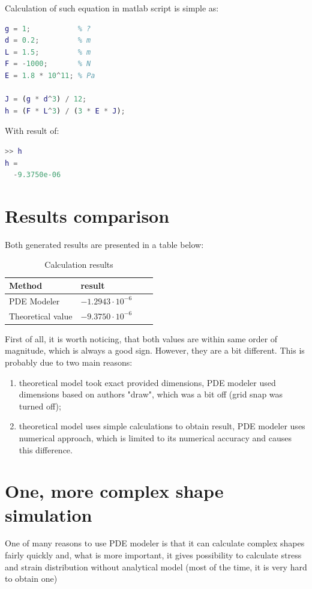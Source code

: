 \documentclass[onecolumn]{article}
\begin{document}
Calculation of such equation in matlab script is simple as:
\begin{lstlisting}[language=Matlab,frame=single,label={lst:autocorr},breaklines=true,caption={Theoretical value calculation script}]
% parameters
g = 1;           % ?
d = 0.2;         % m
L = 1.5;         % m
F = -1000;       % N
E = 1.8 * 10^11; % Pa

J = (g * d^3) / 12;
h = (F * L^3) / (3 * E * J);
\end{lstlisting}

With result of:
\begin{lstlisting}[language=Matlab,frame=single,label={lst:autocorr},breaklines=true,caption={calculation result}]
>> h
h =
  -9.3750e-06
\end{lstlisting}

\newpage
\section{Results comparison}
Both generated results are presented in a table below:
\begin{table}[H]
\centering
\begin{tabular}{|l|l|l|l|}
\hline 
Method  & result \\ \hline 
PDE Modeler & $-1.2943 \cdot 10^{-6}$  \\ \hline 
Theoretical value & $-9.3750 \cdot 10^{-6}$  \\ \hline
\end{tabular}
\caption{Calculation results}
\end{table}

First of all, it is worth noticing, that both values are within same order of magnitude, which is always a good sign. However, they are a bit different. This is probably due to two main reasons:
\begin{enumerate}
    \item theoretical model took exact provided dimensions, PDE modeler used dimensions based on authors "draw", which was a bit off (grid snap was turned off);
    \item theoretical model uses simple calculations to obtain result, PDE modeler uses numerical approach, which is limited to its numerical accuracy and causes this difference.
\end{enumerate}

\section{One, more complex shape simulation}
One of many reasons to use PDE modeler is that it can calculate complex shapes fairly quickly and, what is more important, it gives possibility to calculate stress and strain distribution without analytical model (most of the time, it is very hard to obtain one)
\end{document}
